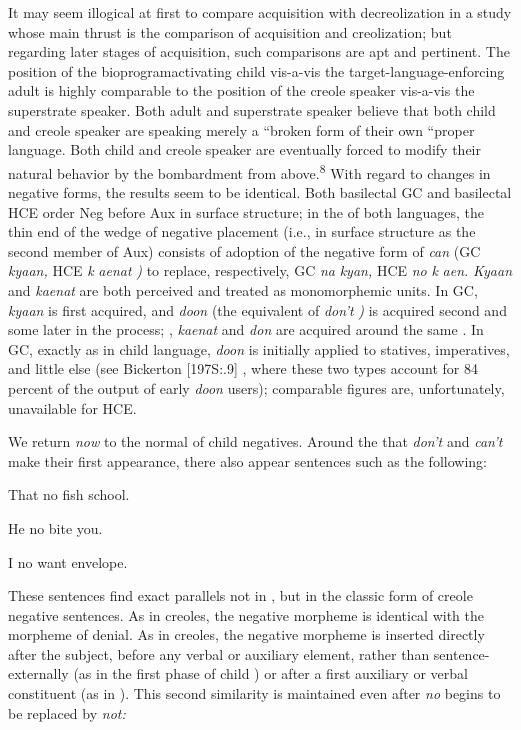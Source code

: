 It may seem illogical at first to compare acquisition with de\-creolization in a study whose main thrust is the comparison of acquisi\-tion and creolization; but regarding later stages of acquisition, such comparisons are apt and pertinent. The position of the bioprogram\-activating child vis-a-vis the target-language-enforcing adult is highly comparable to the position of the creole speaker vis-a-vis the super\-strate speaker. Both adult and superstrate speaker believe that both child and creole speaker are speaking merely a ``broken form of their own ``proper language. Both child and creole speaker are eventually forced to modify their natural behavior by the bombardment from above.\textsuperscript{8} With regard to changes in negative forms, the results seem to be identical. Both basilectal GC and basilectal HCE order Neg
before Aux in surface structure; in the  of both languages, the thin end of the wedge of  negative placement (i.e., in surface structure as the second member of Aux) consists of adoption of the negative form of \textit{can} (GC \textit{kyaan,} HCE \textit{k} \textit{aenat} \textit{)} to replace, respectively, GC \textit{na} \textit{kyan,} HCE \textit{no} \textit{k} \textit{aen.} \textit{Kyaan} and \textit{kaenat} are both perceived and treated as monomorphemic units. In GC, \textit{kyaan} is first acquired, and \textit{doon} (the equivalent of \textit{don't} \textit{)} is acquired second and some  later in the  process; , \textit{kaenat} and \textit{don} are acquired around the same . In GC, exactly as in child language, \textit{doon} is initially applied to statives, imperatives, and little else (see Bickerton [197S:.9] , where these two types account for 84 percent of the output of early \textit{doon} users); comparable figures are, unfortunately, unavailable for HCE.

We return \textit{now} to the normal  of child negatives. Around the  that \textit{don't} and \textit{can't} make their first appearance, there also appear sentences such as the following:

\ea\label{ex:58}
 That no fish school.
\glt
\z

\ea\label{ex:59}
 He no bite you.
\glt
\z

\ea\label{ex:60}
 I no want envelope.
\glt
\z

These sentences find exact parallels not in , but in the classic form of creole negative sentences. As in creoles, the negative morpheme is identical with the morpheme of denial. As in creoles, the negative morpheme is inserted directly after the subject, before any verbal or auxiliary element, rather than sentence-externally (as in the first phase of child ) or after a first auxiliary or verbal constituent (as in ). This second similarity is maintained even after \textit{no} begins to be replaced by \textit{not:}

